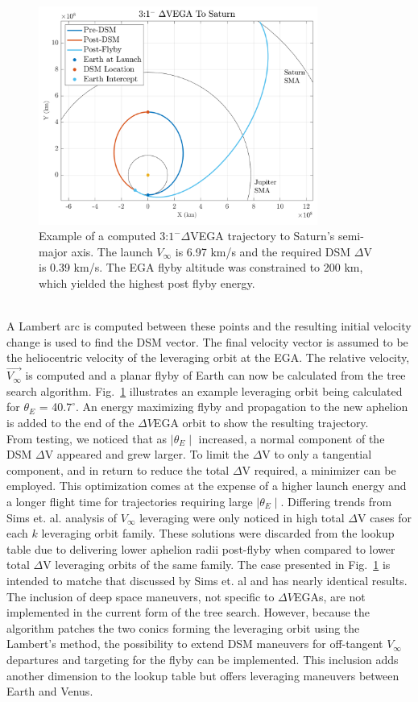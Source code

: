 \documentclass[letterpaper, paper,11pt]{./AAS}		%
\begin{document}
%
%
\begin{figure}[htb]
	\centering\includegraphics[width=3.6in]{./Figures/dsmmatlab}
	\caption{Example of a computed 3:$1^{-} \Delta$VEGA trajectory to Saturn's semi-major axis. The launch $V_\infty$ is 6.97 km/s and the required DSM $\Delta$V is 0.39 km/s. The EGA flyby altitude was constrained to 200 km, which yielded the highest post flyby energy.}
	\label{fig:dsmmatlab}
\end{figure}
%
\\A Lambert arc is computed between these points and the resulting initial velocity change is used to find the DSM vector. The final velocity vector is assumed to be the heliocentric velocity of the leveraging orbit at the EGA. The relative velocity, $\vec{V_\infty}$ is computed and a planar flyby of Earth can now be calculated from the tree search algorithm. Fig.~\ref{fig:dsmmatlab} illustrates an example leveraging orbit being calculated for $\theta_{E}$ = 40.$7^{\circ}$. An energy maximizing flyby and propagation to the new aphelion is added to the end of the $\Delta V$EGA orbit to show the resulting trajectory.
\\\indent From testing, we noticed that as $\mid\theta_E\mid$ increased, a normal component of the DSM $\Delta$V appeared and grew larger. To limit the $\Delta$V to only a tangential component, and in return to reduce the total $\Delta$V required, a minimizer can be employed. This optimization comes at the expense of a higher launch energy and a longer flight time for trajectories requiring large $\mid\theta_E\mid$. Differing trends from Sims et. al. analysis of $V_\infty$ leveraging\cite{sims1994} were only noticed in high total $\Delta$V cases for each $k$ leveraging orbit family. These solutions were discarded from the lookup table due to delivering lower aphelion radii post-flyby when compared to lower total $\Delta$V leveraging orbits of the same family. The case presented in Fig.~\ref{fig:dsmmatlab} is intended to matche that discussed by Sims et. al\cite{Sims1997} and has nearly identical results. The inclusion of deep space maneuvers, not specific to $\Delta V$EGAs, are not implemented in the current form of the tree search. However, because the algorithm patches the two conics forming the leveraging orbit using the Lambert's method, the possibility to extend DSM maneuvers for off-tangent $V_\infty$ departures and targeting for the flyby can be implemented. This inclusion adds another dimension to the lookup table but offers leveraging maneuvers between Earth and Venus.
\end{document}
